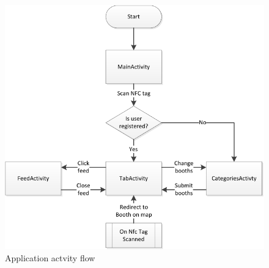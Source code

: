 \begin{figure}[H]
\centering
\includegraphics[width=\columnwidth]{img/appFlowchart.pdf}
\caption{Application actvity flow\label{fig:flowchart}}
\end{figure}
